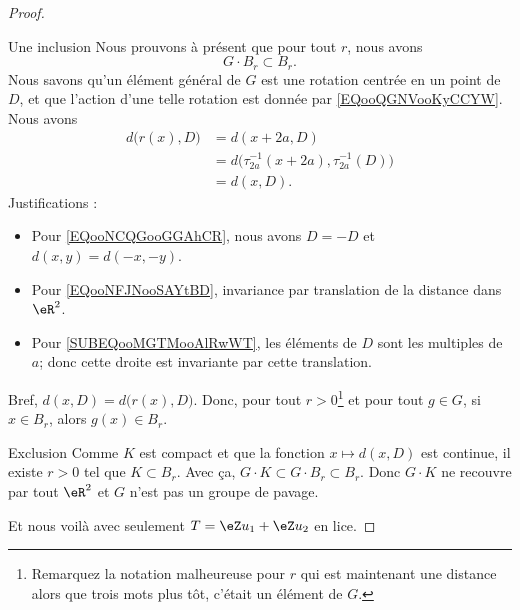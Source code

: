 \begin{proof}
\begin{subproof}
\begin{subproof}
			\item[Une inclusion]
			Nous prouvons à présent que pour tout \( r\), nous avons
			\begin{equation}
				G\cdot B_r \subset B_r.
			\end{equation}
			Nous savons qu'un élément général de \( G\) est une rotation centrée en un point de \( D\), et que l'action d'une telle rotation est donnée par \eqref{EQooQGNVooKyCCYW}. Nous avons
			\begin{subequations}
				\begin{align}
					d\big( r(x),D \big) & =d(x+2a,D)                                            \label{EQooNCQGooGGAhCR}  \\
					                    & =d\big( \tau_{2a}^{-1}(x+2a),\tau_{2a}^{-1}(D) \big)  \label{EQooNFJNooSAYtBD}  \\
					                    & =d(x,D)                                               \label{SUBEQooMGTMooAlRwWT}.
				\end{align}
			\end{subequations}
			Justifications :
			\begin{itemize}
				\item Pour \eqref{EQooNCQGooGGAhCR}, nous avons \( D=-D\) et \(d(x,y)=d(-x,-y) \).
				\item Pour \eqref{EQooNFJNooSAYtBD}, invariance par translation de la distance dans \( \eR^2\).
				\item Pour \eqref{SUBEQooMGTMooAlRwWT}, les éléments de \( D\) sont les multiples de \( a\); donc cette droite est invariante par cette translation.
			\end{itemize}
			Bref, \( d(x,D)=d\big( r(x),D \big) \). Donc, pour tout \( r>0\)\footnote{Remarquez la notation malheureuse pour \( r\) qui est maintenant une distance alors que trois mots plus tôt, c'était un élément de \( G\).} et pour tout \( g\in G\), si \( x\in B_r\), alors \( g(x)\in B_r\).

			\item[Exclusion]
			Comme \( K\) est compact et que la fonction \( x\mapsto d(x,D)\) est continue, il existe \( r>0\) tel que \( K\subset B_r\). Avec ça, \( G\cdot K\subset G\cdot B_r\subset B_r\). Donc \( G\cdot K\) ne recouvre par tout \( \eR^2\) et \( G\) n'est pas un groupe de pavage.
		\end{subproof}
	\end{subproof}

	Et nous voilà avec seulement \( T=\eZ u_1+\eZ u_2\) en lice.


\end{proof}
